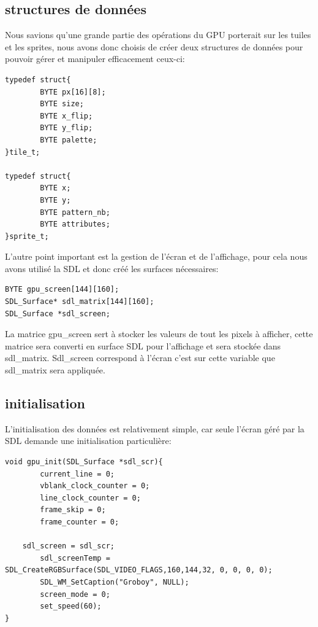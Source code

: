 \documentclass{report}
\begin{document}
\subsection{structures de données}
	Nous savions qu'une grande partie des opérations du GPU porterait sur les tuiles et les sprites, nous avons donc choisis de créer deux structures de données pour pouvoir gérer et manipuler efficacement ceux-ci:\\ 
\begin{lstlisting}
typedef struct{
        BYTE px[16][8];
        BYTE size;
        BYTE x_flip;
        BYTE y_flip;
        BYTE palette;
}tile_t;

typedef struct{
        BYTE x;
        BYTE y;
        BYTE pattern_nb;
        BYTE attributes;
}sprite_t;
\end{lstlisting}

L'autre point important est la gestion de l'écran et de l'affichage, pour cela nous avons utilisé la SDL et donc créé les surfaces nécessaires:\\
\begin{lstlisting}
BYTE gpu_screen[144][160];
SDL_Surface* sdl_matrix[144][160];
SDL_Surface *sdl_screen;
\end{lstlisting}

La matrice gpu\_screen sert à stocker les valeurs de tout les pixels à afficher, cette matrice sera converti en surface SDL pour l'affichage et sera stockée dans sdl\_matrix. Sdl\_screen correspond à l'écran c'est sur cette variable que sdl\_matrix sera appliquée.\\

\subsection{initialisation}
	L'initialisation des données est relativement simple, car seule l'écran géré par la SDL demande une initialisation particulière:\\
\begin{lstlisting}
void gpu_init(SDL_Surface *sdl_scr){
        current_line = 0;
        vblank_clock_counter = 0;
        line_clock_counter = 0;
        frame_skip = 0;
        frame_counter = 0;
        
	sdl_screen = sdl_scr;
        sdl_screenTemp = SDL_CreateRGBSurface(SDL_VIDEO_FLAGS,160,144,32, 0, 0, 0, 0);
        SDL_WM_SetCaption("Groboy", NULL);
        screen_mode = 0;
        set_speed(60);
}

\end{lstlisting}
\end{document}
